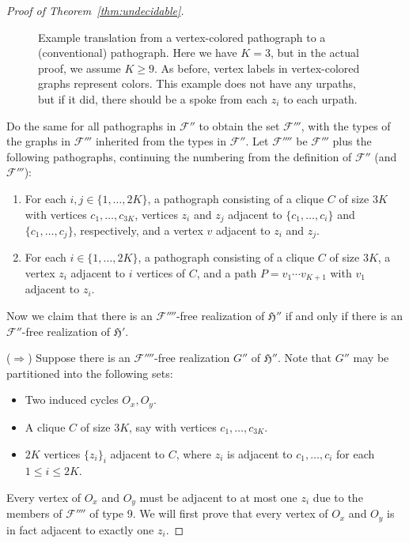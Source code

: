 \documentclass{article}
\renewcommand{\vert}[2]{\node[dot] (#1) at (#2) {};}
\newcommand{\edge}[2]{\draw (#1) -- (#2);}
\newcommand{\Fc}{\mathcal{F}}
\newcommand{\Hf}{\mathfrak{H}}
\begin{document}
\begin{proof}[Proof of Theorem~\ref{thm:undecidable}]
\begin{figure}[htbp!]
    \caption{Example translation from a vertex-colored pathograph to a (conventional) pathograph. Here we have $K=3$, but in the actual proof, we assume $K\ge 9$. As before, vertex labels in vertex-colored graphs represent colors. This example does not have any urpaths, but if it did, there should be a spoke from each $z_i$ to each urpath.}
    \label{fig:uncolored}
\end{figure}

Do the same for all pathographs in $\Fc''$ to obtain the set $\Fc'''$, with the types of the graphs in $\Fc'''$ inherited from the types in $\Fc''$. Let $\Fc''''$ be $\Fc'''$ plus the following pathographs, continuing the numbering from the definition of $\Fc''$ (and $\Fc'''$):
\begin{enumerate}[start=9]
    \item For each $i,j\in \{1,\dots,2K\}$, a pathograph consisting of a clique $C$ of size $3K$ with vertices $c_1,\dots,c_{3K}$, vertices $z_i$ and $z_j$ adjacent to $\{c_1,\dots,c_i\}$ and $\{c_1,\dots,c_j\}$, respectively, and a vertex $v$ adjacent to $z_i$ and $z_j$.
    \item For each $i\in\{1,\dots,2K\}$, a pathograph consisting of a clique $C$ of size $3K$, a vertex $z_i$ adjacent to $i$ vertices of $C$, and a path $P=v_1\cdots v_{K+1}$ with $v_1$ adjacent to $z_i$.
\end{enumerate}

Now we claim that there is an $\Fc''''$-free realization of $\Hf''$ if and only if there is an $\Fc''$-free realization of $\Hf'$.

($\Rightarrow$) Suppose there is an $\Fc''''$-free realization $G''$ of $\Hf''$. Note that $G''$ may be partitioned into the following sets:
\begin{itemize}
    \item Two induced cycles $O_x,O_y$.
    \item A clique $C$ of size $3K$, say with vertices $c_1,\dots,c_{3K}$.
    \item $2K$ vertices $\{z_i\}_i$ adjacent to $C$, where $z_i$ is adjacent to $c_1,\dots,c_i$ for each $1\le i\le 2K$.
\end{itemize}
Every vertex of $O_x$ and $O_y$ must be adjacent to at most one $z_i$ due to the members of $\Fc''''$ of type 9. We will first prove that every vertex of $O_x$ and $O_y$ is in fact adjacent to exactly one $z_i$.


\end{proof}
\end{document}
